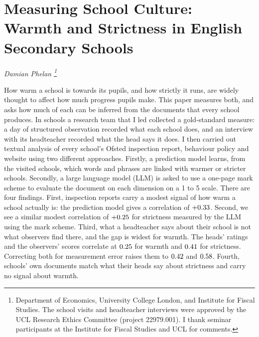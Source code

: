 \chapter{Measuring School Culture: Warmth and Strictness in English Secondary Schools}
\label{ch:paper1}
\resetcounterformats

\begin{center}
  \textit{Damian Phelan%
    \footnote{Department of Economics, University College London, and
      Institute for Fiscal Studies. The
      school visits and headteacher interviews were approved by the UCL
      Research Ethics Committee (project 22979.001). I thank seminar
      participants at the Institute for Fiscal Studies and UCL for
      comments.}}
\end{center}

\begin{chapterabstract}
How warm a school is towards its pupils, and how strictly it runs, are
widely thought to affect how much progress pupils make. This paper measures both, and asks
how much of each can be inferred from the documents that every school
produces. In \NTierOne{} schools a research team that I led collected a gold-standard measure: a day
of structured observation recorded what each school does, and an interview
with its headteacher recorded what the head says it does. I then carried out textual analysis of
every school's Ofsted inspection report, behaviour policy and website using two different approaches.
Firstly, a prediction model learns, from the visited schools, which words and phrases
are linked with warmer or stricter schools.  Secondly, a large language model (LLM) is asked to
use a one-page mark scheme to evaluate the document on each dimension on a 1 to 5 scale.
There are four findings. First, inspection reports carry a modest signal of how warm a
school actually is: the prediction model gives a correlation of $+0.33$. Second, we see a similar modest correlation
of $+0.25$ for strictness measured by the LLM using the mark scheme.
Third, what a headteacher says about their school is not what observers find there, and the gap
is widest for warmth. The heads' ratings and the observers' scores correlate at $0.25$ for warmth and $0.41$ for strictness. Correcting both for measurement error raises them to $0.42$ and $0.58$. Fourth, schools' own documents match what their heads say about strictness and carry no signal about warmth.
\end{chapterabstract}

